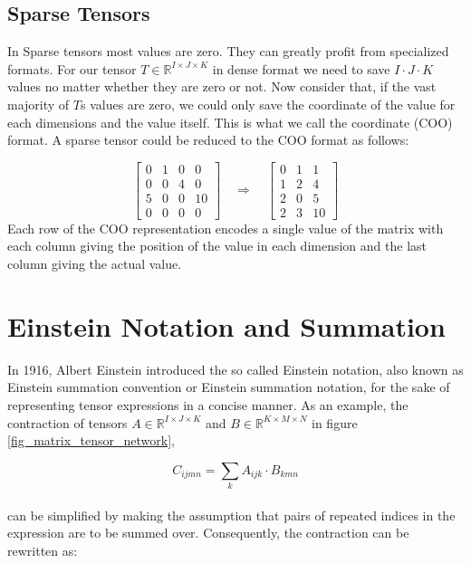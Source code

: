 \subsection{Sparse Tensors}
In Sparse tensors most values are zero. They can greatly profit from specialized
formats. For our tensor $T \in \mathbb{R}^{I \times J \times K}$ in dense format
we need to save $I \cdot J \cdot K$ values no matter whether they are zero or not.
Now consider that, if the vast majority of $T$s values are zero, we could only save
the coordinate of the value for each dimensions and the value itself. This is what
we call the coordinate (COO) format. A sparse tensor could be reduced to the COO
format as follows:

\begin{equation*}
    \begin{bmatrix}
        0 & 1 & 0 & 0  \\
        0 & 0 & 4 & 0  \\
        5 & 0 & 0 & 10 \\
        0 & 0 & 0 & 0
    \end{bmatrix}
    \quad
    \Rightarrow
    \quad
    \begin{bmatrix}
        0 & 1 & 1  \\
        1 & 2 & 4  \\
        2 & 0 & 5  \\
        2 & 3 & 10
    \end{bmatrix}
\end{equation*}
%
Each row of the COO representation encodes a single value of the matrix with each
column giving the position of the value in each dimension and the last column giving
the actual value.

\section{Einstein Notation and Summation}
In 1916, Albert Einstein introduced the so called Einstein notation, also known as
Einstein summation convention or Einstein summation notation, for the sake of
representing tensor expressions in a concise manner. As an example, the contraction of tensors
$A \in \mathbb{R}^{I \times J \times K}$ and $B \in \mathbb{R}^{K \times M \times N}$
in figure \ref{fig_matrix_tensor_network},

\[C_{ijmn} = \sum_{k}A_{ijk} \cdot B_{kmn}\]
\noindent
\\
can be simplified by making the assumption that pairs of repeated indices in the expression
are to be summed over. Consequently, the contraction can be rewritten as:

